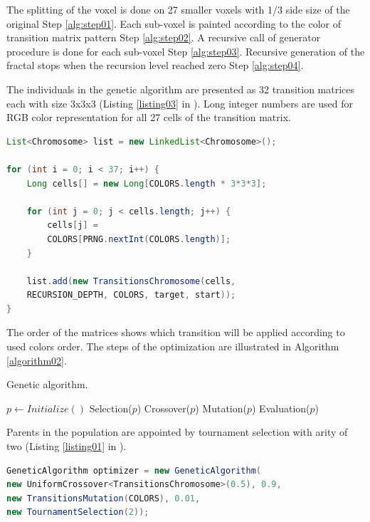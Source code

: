 \documentclass[runningheads]{llncs}
\begin{document}
The splitting of the voxel is done on 27 smaller voxels with 1/3 side size of the original Step \ref{alg:step01}. Each sub-voxel is painted according to the color of transition matrix pattern Step \ref{alg:step02}. A recursive call of generator procedure is done for each sub-voxel Step \ref{alg:step03}. Recursive generation of the fractal stops when the recursion level reached zero Step \ref{alg:step04}.

The individuals in the genetic algorithm are presented as 32 transition matrices each with size 3x3x3 (Listing \ref{listing03} in \cite{balabanov01}). Long integer numbers are used for RGB color representation for all 27 cells of the transition matrix. 

\begin{lstlisting}[language=Java, caption=Chromosomes encoding., label=listing03]
List<Chromosome> list = new LinkedList<Chromosome>();

for (int i = 0; i < 37; i++) {
	Long cells[] = new Long[COLORS.length * 3*3*3];
	
	for (int j = 0; j < cells.length; j++) {
		cells[j] = 
		COLORS[PRNG.nextInt(COLORS.length)];
	}
	
	list.add(new TransitionsChromosome(cells, 
	RECURSION_DEPTH, COLORS, target, start));
}
\end{lstlisting}

The order of the matrices shows which transition will be applied according to used colors order. The steps of the optimization are illustrated in Algorithm \ref{algorithm02}. 

\begin{algorithm}
\caption{Genetic algorithm.}\label{algorithm02}
\begin{algorithmic}[1]
\State $p \gets Initialize()$
  \State Selection($p$)
  \State Crossover($p$)
  \State Mutation($p$)
  \State Evaluation($p$)
\EndWhile
\EndProcedure
\end{algorithmic}
\end{algorithm}
\FloatBarrier

Parents in the population are appointed by tournament selection with arity of two (Listing \ref{listing01} in \cite{balabanov01}). 

\begin{lstlisting}[language=Java, caption=Genetic algorithm parameters., label=listing01]
GeneticAlgorithm optimizer = new GeneticAlgorithm(
new UniformCrossover<TransitionsChromosome>(0.5), 0.9, 
new TransitionsMutation(COLORS), 0.01, 
new TournamentSelection(2));
\end{lstlisting}
\end{document}

